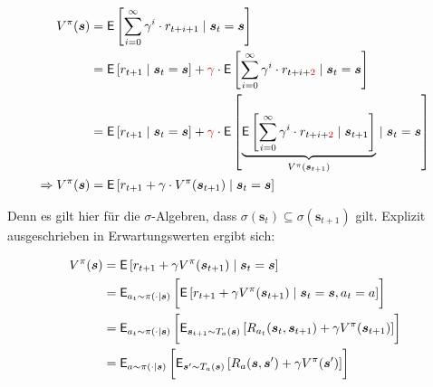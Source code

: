 \begin{align*}
    V^{\pi}(\bm{s}) 
    &= \mathsf{E} 
    \left[
        \sum_{i=0}^{\infty} \gamma^i \cdot r_{t+i+1} \mid \bm{s}_t = \bm{s}
    \right]
    \\
    &= 
    \mathsf{E} 
    \left[
        r_{t+1} \mid \bm{s}_t = \bm{s}
    \right]
    +
    \rot{\gamma} \cdot
    \mathsf{E} 
    \left[
        \sum_{i=0}^{\infty} \gamma^{i} \cdot r_{t+i+\rot{2}} \mid \bm{s}_t = \bm{s}
    \right]
    \\
    &=
    \mathsf{E} 
    \left[
        r_{t+1} \mid \bm{s}_t = \bm{s}
    \right]
    +
    \rot{\gamma} \cdot
    \mathsf{E} 
    \left[
        \underbrace{        
            \mathsf{E}
            \left[
                \sum_{i=0}^{\infty} \gamma^{i} \cdot r_{t+i+\rot{2}} \mid \bm{s}_{t+1}
            \right]
            }_{
                V^{\pi}(\bm{s}_{t+1})
            }
        \mid \bm{s}_t = \bm{s}
    \right]
    \\
    \Rightarrow
    V^{\pi}(\bm{s})
    &=
    \mathsf{E} 
    \left[
        r_{t+1} + \gamma \cdot V^{\pi}(\bm{s}_{t+1}) \mid \bm{s}_t = \bm{s}
    \right] 
\end{align*}

Denn es gilt hier für die $\sigma$-Algebren, 
dass $\sigma(\bm{s}_t ) \subseteq \sigma(\bm{s}_{t+1})$ gilt. 
Explizit ausgeschrieben in Erwartungswerten ergibt sich:

\begin{align*}
    V^{\pi}(\bm{s})
    &= \mathsf{E} 
        \left[ 
            r_{t+1} + \gamma V^{\pi}(\bm{s}_{t+1}) \mid \bm{s}_t = \bm{s} 
        \right] \\
    &= \mathsf{E}_{a_t \sim \pi(\cdot|\bm{s})} 
        \left[ 
            \vphantom{\int}
            \mathsf{E} 
            \left[ 
                r_{t+1} + \gamma V^{\pi}(\bm{s}_{t+1}) \mid \bm{s}_t = \bm{s}, a_t = a 
            \right] 
        \right] \\
    &= \mathsf{E}_{a_t \sim \pi(\cdot|\bm{s})} 
    \left[ 
        \vphantom{\int}
        \mathsf{E}_{\bm{s}_{t+1} \sim T_a(\bm{s})} 
        \left[ 
            R_{a_t}(\bm{s}_t, \bm{s}_{t+1}) + \gamma V^{\pi}(\bm{s}_{t+1}) 
        \right] 
    \right] \\
    &= \mathsf{E}_{a \sim \pi(\cdot|\bm{s})} 
        \left[ 
            \vphantom{\int}
            \mathsf{E}_{\bm{s}' \sim T_a(\bm{s})} 
            \left[ 
                R_{a}(\bm{s}, \bm{s}') + \gamma V^{\pi}(\bm{s}') 
            \right] 
        \right]
\end{align*}

